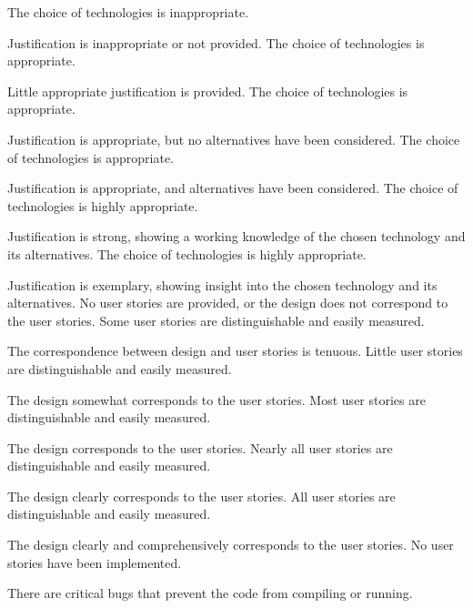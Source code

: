 \documentclass{../fal_assignment}
\begin{document}
\begin{markingrubric}
%
        \grade\fail The choice of technologies is inappropriate.
            \par Justification is inappropriate or not provided.
        \grade The choice of technologies is appropriate.
            \par Little appropriate justification is provided.
        \grade The choice of technologies is appropriate.
            \par Justification is appropriate, but no alternatives have been considered.
        \grade The choice of technologies is appropriate.
            \par Justification is appropriate, and alternatives have been considered.
        \grade The choice of technologies is highly appropriate.
            \par Justification is strong, showing a working knowledge of the chosen technology and its alternatives.
        \grade The choice of technologies is highly appropriate.
            \par Justification is exemplary, showing insight into the chosen technology and its alternatives.
%
        \grade\fail No user stories are provided, or the design does not correspond to the user stories.
        \grade Some user stories are distinguishable and easily measured.
            \par The correspondence between design and user stories is tenuous.
        \grade Little user stories are distinguishable and easily measured.
            \par The design somewhat corresponds to the user stories.
        \grade Most user stories are distinguishable and easily measured.
            \par The design corresponds to the user stories.
        \grade Nearly all user stories are distinguishable and easily measured.
            \par The design clearly corresponds to the user stories.
        \grade All user stories are distinguishable and easily measured.
            \par The design clearly and comprehensively corresponds to the user stories.
%
        \grade\fail No user stories have been implemented.
            \par There are critical bugs that prevent the code from compiling or running.

\end{markingrubric}
\end{document}
